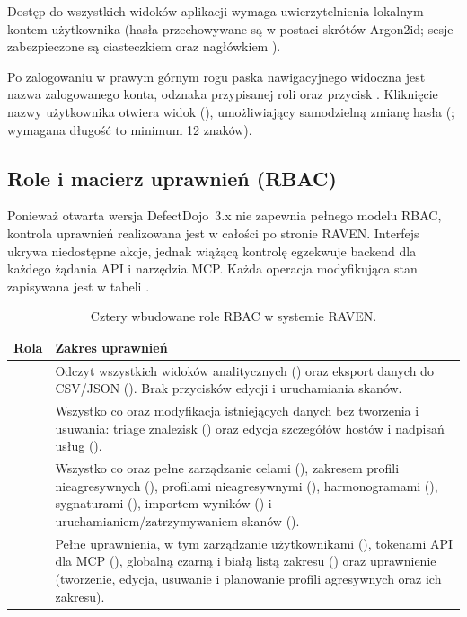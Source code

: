 \documentclass[10pt,a4paper]{article}
\begin{document}
Dostęp do wszystkich widoków aplikacji wymaga uwierzytelnienia lokalnym kontem użytkownika (hasła przechowywane są w postaci skrótów Argon2id; sesje zabezpieczone są ciasteczkiem  oraz nagłówkiem ).

Po zalogowaniu w prawym górnym rogu paska nawigacyjnego widoczna jest nazwa zalogowanego konta, odznaka przypisanej roli oraz przycisk . Kliknięcie nazwy użytkownika otwiera widok  (), umożliwiający samodzielną zmianę hasła (; wymagana długość to minimum 12 znaków).

\subsection{Role i macierz uprawnień (RBAC)}

Ponieważ otwarta wersja DefectDojo~3.x nie zapewnia pełnego modelu RBAC, kontrola uprawnień realizowana jest w całości po stronie RAVEN. Interfejs ukrywa niedostępne akcje, jednak wiążącą kontrolę egzekwuje backend dla każdego żądania API i narzędzia MCP. Każda operacja modyfikująca stan zapisywana jest w tabeli .

\begin{table}[htbp]
  \centering
  \footnotesize
  \begin{tabularx}{\linewidth}{@{}L{22mm}Y@{}}
    \toprule
    \textbf{Rola} & \textbf{Zakres uprawnień} \\
    \midrule
     & Odczyt wszystkich widoków analitycznych () oraz eksport danych do CSV/JSON (). Brak przycisków edycji i uruchamiania skanów. \\
     & Wszystko co  oraz modyfikacja istniejących danych bez tworzenia i usuwania: triage znalezisk () oraz edycja szczegółów hostów i nadpisań usług (). \\
     & Wszystko co  oraz pełne zarządzanie celami (), zakresem profili nieagresywnych (), profilami nieagresywnymi (), harmonogramami (), sygnaturami (), importem wyników () i uruchamianiem/zatrzymywaniem skanów (). \\
     & Pełne uprawnienia, w tym zarządzanie użytkownikami (), tokenami API dla MCP (), globalną czarną i białą listą zakresu () oraz uprawnienie  (tworzenie, edycja, usuwanie i planowanie profili agresywnych oraz ich zakresu). \\
    \bottomrule
  \end{tabularx}
  \caption{Cztery wbudowane role RBAC w systemie RAVEN.}
  \label{tab:rbac}
\end{table}
\end{document}
